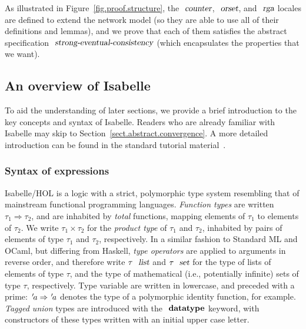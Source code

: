 As illustrated in Figure~\ref{fig.proof.structure}, the $\isa{counter}$, $\isa{orset}$, and $\isa{rga}$ locales are defined to extend the network model (so they are able to use all of their definitions and lemmas), and we prove that each of them satisfies the abstract specification $\isa{strong-eventual-consistency}$ (which encapsulates the properties that we want).

\subsection{An overview of Isabelle}
\label{subsect.an.overview.of.isabelle}

To aid the understanding of later sections, we provide a brief introduction to the key concepts and syntax of Isabelle.
Readers who are already familiar with Isabelle may skip to Section~\ref{sect.abstract.convergence}.
A more detailed introduction can be found in the standard tutorial material~\cite{DBLP:books/sp/NipkowK14}.

\subsubsection{Syntax of expressions}\label{sect.isabelle.syntax}

Isabelle/HOL is a logic with a strict, polymorphic type system resembling that of mainstream functional programming languages.
\emph{Function types} are written $\tau_1 \Rightarrow \tau_2$, and are inhabited by \emph{total} functions, mapping elements of $\tau_1$ to elements of $\tau_2$.
We write $\tau_1 \times \tau_2$ for the \emph{product type} of $\tau_1$ and $\tau_2$, inhabited by pairs of elements of type $\tau_1$ and $\tau_2$, respectively.
In a similar fashion to Standard ML and OCaml, but differing from Haskell, \emph{type operators} are applied to arguments in reverse order, and therefore write $\tau\ \isa{list}$ and $\tau\ \isa{set}$ for the type of lists of elements of type $\tau$, and the type of mathematical (i.e., potentially infinite) sets of type $\tau$, respectively.
Type variable are written in lowercase, and preceded with a prime: ${\emph{$\mskip2mu{'}\mskip-2mu$}}a \Rightarrow {\emph{$\mskip2mu{'}\mskip-2mu$}}a$ denotes the type of a polymorphic identity function, for example.
\emph{Tagged union} types are introduced with the $\isacommand{datatype}$ keyword, with constructors of these types written with an initial upper case letter.

